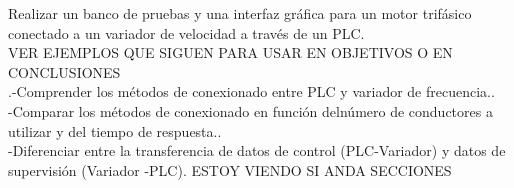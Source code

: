 Realizar un banco de pruebas y una interfaz gráfica para un motor trifásico conectado a un variador de velocidad a través de un PLC.\\
VER EJEMPLOS QUE SIGUEN PARA USAR EN OBJETIVOS O EN CONCLUSIONES\\
.-Comprender los   métodos de   conexionado   entre   PLC   y   variador   de frecuencia..\\-Comparar   los   métodos   de   conexionado   en   función   delnúmero   de conductores a utilizar y del tiempo de respuesta..\\-Diferenciar entre la transferencia de datos de control (PLC-Variador) y datos de supervisión (Variador -PLC).
ESTOY VIENDO SI ANDA SECCIONES

\newpage
